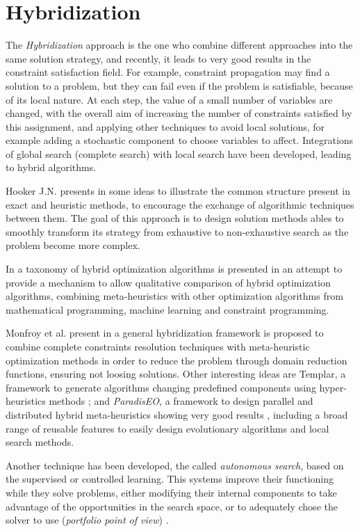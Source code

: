 \section{Hybridization}
\label{sec:hybrid}

The \textit{Hybridization} approach is the one who combine different approaches into the same solution strategy, and recently, it leads to very good results in the constraint satisfaction field. For example, constraint propagation may find a solution to a problem, but they can fail even if the problem is satisfiable, because of its local nature. At each step, the value of a small number of variables are changed, with the overall aim of increasing the number of constraints satisfied by this assignment, and applying other techniques to avoid local solutions, for example adding a stochastic component to choose variables to affect. Integrations of global search (complete search) with local search have been developed, leading to hybrid algorithms. 

Hooker J.N. presents in \cite{Hooker2012} some ideas to illustrate the common structure present in exact and heuristic methods, to encourage the exchange of algorithmic techniques between them. The goal of this approach is to design solution methods ables to smoothly transform its strategy from exhaustive to non-exhaustive search as the problem become more complex.

In \cite{El-Ghazali2013} a taxonomy of hybrid optimization algorithms is presented in an attempt to provide a mechanism to allow qualitative comparison of hybrid optimization algorithms, combining meta-heuristics with other optimization algorithms from mathematical programming, machine learning and constraint programming.

Monfroy et al. present in \cite{Monfroya,Monfroyb} a general hybridization framework is proposed to combine complete constraints resolution techniques with meta-heuristic optimization methods in order to reduce the problem through domain reduction functions, ensuring not loosing solutions. Other interesting ideas are {\sc Templar}, a framework to generate algorithms changing predefined components using hyper-heuristics methods \cite{Swan2015}; and {\it ParadisEO}, a framework to design parallel and distributed hybrid meta-heuristics showing very good results \cite{Cahon2004}, including a broad range of reusable features to easily design evolutionary algorithms and local search methods.

Another technique has been developed, the called {\it autonomous search}, based on the supervised or controlled learning. This systems improve their functioning while they solve problems, either  modifying their internal components to take advantage of the opportunities in the search space, or to adequately chose the solver to use ({\it portfolio point of view}) \cite{WhatIsAuto}.

